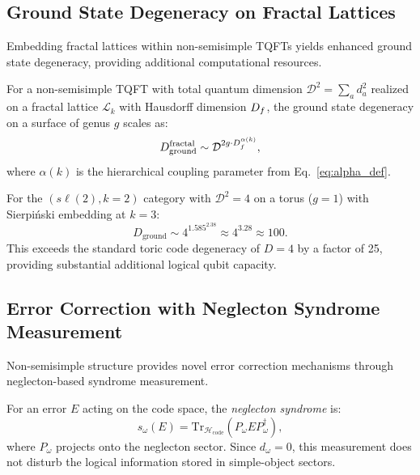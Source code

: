\subsection{Ground State Degeneracy on Fractal Lattices}

Embedding fractal lattices within non-semisimple TQFTs yields enhanced
ground state degeneracy, providing additional computational resources.

\begin{proposition}
\label{prop:degeneracy}
For a non-semisimple TQFT with total quantum dimension
$\mathcal{D}^2 = \sum_a d_a^2$ realized on a fractal lattice
$\mathcal{L}_k$ with Hausdorff dimension $D_f$, the ground state
degeneracy on a surface of genus $g$ scales as:
\begin{equation}
D_{\mathrm{ground}}^{\mathrm{fractal}} \sim
\mathcal{D}^{2g \cdot D_f^{\alpha(k)}},
\label{eq:fractal_degeneracy}
\end{equation}
where $\alpha(k)$ is the hierarchical coupling parameter from
Eq.~\eqref{eq:alpha_def}.
\end{proposition}

For the $(s\ell(2), k=2)$ category with $\mathcal{D}^2 = 4$ on a
torus ($g = 1$) with Sierpi\'{n}ski embedding at $k = 3$:
\begin{equation}
D_{\mathrm{ground}} \sim 4^{1.585^{2.38}} \approx 4^{3.28} \approx 100.
\end{equation}
This exceeds the standard toric code degeneracy of $D = 4$ by a
factor of 25, providing substantial additional logical qubit capacity.

\subsection{Error Correction with Neglecton Syndrome Measurement}

Non-semisimple structure provides novel error correction mechanisms
through neglecton-based syndrome measurement.

\begin{definition}
\label{def:syndrome}
For an error $E$ acting on the code space, the \emph{neglecton syndrome}
is:
\begin{equation}
s_\omega(E) = \mathrm{Tr}_{\mathcal{H}_{\mathrm{code}}}
(P_\omega E P_\omega^\dagger),
\label{eq:neglecton_syndrome}
\end{equation}
where $P_\omega$ projects onto the neglecton sector. Since
$d_\omega = 0$, this measurement does not disturb the logical
information stored in simple-object sectors.
\end{definition}

